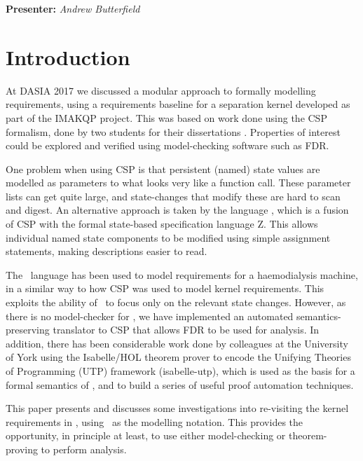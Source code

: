 
\begin{center}
\textbf{Presenter:} \emph{Andrew Butterfield}
\end{center}

\section{Introduction}

At DASIA 2017\cite{Lero-DASIA17}
we discussed a modular approach to formally modelling
requirements, using a requirements baseline for a separation kernel developed
as part of the IMAKQP project\cite{IMAKQP-D02}.
This was based on work done using the CSP formalism\cite{hoare-1985:commuseque:},
done by two students for their dissertations \cite{KH-MCS2016,Costelloe17}.
Properties of interest could be explored and verified using
model-checking software such as FDR\cite{FDR3}.

One problem when using CSP is that persistent (named) state values
are modelled as parameters to what looks very like a function call.
These parameter lists can get quite large, and state-changes that
modify these are hard to scan and digest.
An alternative approach is taken by the language \Circus\cite{WC01,OCW2007},
which is a fusion of CSP with the formal state-based specification language Z\cite{UsingZ}.
This allows individual named state components to be modified using simple
assignment statements, making descriptions easier to read.

The \Circus\ language has been used to model requirements
for a haemodialysis machine\cite{DBLP:conf/asm/GomesB16},
in a similar way to how CSP was used to model kernel requirements.
This exploits the ability of \Circus\ to focus only on the relevant state changes.
However, as there is no model-checker for \Circus,
we have implemented an automated semantics-preserving translator to CSP
that allows FDR to be used for analysis.
In addition, there has been considerable work done by colleagues at
the University of York using the Isabelle/HOL theorem prover\cite{NPW02}
to encode the Unifying Theories of Programming (UTP) framework (\textsf{isabelle-utp}),
which is used as the basis for a formal semantics of \Circus,
and to build a series of useful proof automation techniques\cite{FosterZW14}.

This paper presents and discusses some investigations
into re-visiting the kernel requirements in \cite{IMAKQP-D02},
using \Circus\ as the modelling notation.
This provides the opportunity, in principle at least,
to use either model-checking or theorem-proving to perform analysis.

